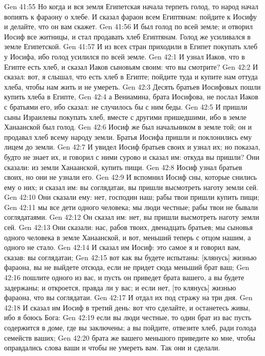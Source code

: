 Gen 41:55  Но когда и вся земля Египетская начала терпеть голод, то народ начал вопиять к фараону о хлебе. И сказал фараон всем Египтянам: пойдите к Иосифу и делайте, что он вам скажет.
Gen 41:56  И был голод по всей земле; и отворил Иосиф все житницы, и стал продавать хлеб Египтянам. Голод же усиливался в земле Египетской.
Gen 41:57  И из всех стран приходили в Египет покупать хлеб у Иосифа, ибо голод усилился по всей земле.
Gen 42:1  И узнал Иаков, что в Египте есть хлеб, и сказал Иаков сыновьям своим: что вы смотрите?
Gen 42:2  И сказал: вот, я слышал, что есть хлеб в Египте; пойдите туда и купите нам оттуда хлеба, чтобы нам жить и не умереть.
Gen 42:3  Десять братьев Иосифовых пошли купить хлеба в Египте,
Gen 42:4  а Вениамина, брата Иосифова, не послал Иаков с братьями его, ибо сказал: не случилось бы с ним беды.
Gen 42:5  И пришли сыны Израилевы покупать хлеб, вместе с другими пришедшими, ибо в земле Ханаанской был голод.
Gen 42:6  Иосиф же был начальником в земле той; он и продавал хлеб всему народу земли. Братья Иосифа пришли и поклонились ему лицем до земли.
Gen 42:7  И увидел Иосиф братьев своих и узнал их; но показал, будто не знает их, и говорил с ними сурово и сказал им: откуда вы пришли? Они сказали: из земли Ханаанской, купить пищи.
Gen 42:8  Иосиф узнал братьев своих, но они не узнали его.
Gen 42:9  И вспомнил Иосиф сны, которые снились ему о них; и сказал им: вы соглядатаи, вы пришли высмотреть наготу земли сей.
Gen 42:10  Они сказали ему: нет, господин наш; рабы твои пришли купить пищи;
Gen 42:11  мы все дети одного человека; мы люди честные; рабы твои не бывали соглядатаями.
Gen 42:12  Он сказал им: нет, вы пришли высмотреть наготу земли сей.
Gen 42:13  Они сказали: нас, рабов твоих, двенадцать братьев; мы сыновья одного человека в земле Ханаанской, и вот, меньший теперь с отцом нашим, а одного не стало.
Gen 42:14  И сказал им Иосиф: это самое я и говорил вам, сказав: вы соглядатаи;
Gen 42:15  вот как вы будете испытаны: [клянусь] жизнью фараона, вы не выйдете отсюда, если не придет сюда меньший брат ваш;
Gen 42:16  пошлите одного из вас, и пусть он приведет брата вашего, а вы будете задержаны; и откроется, правда ли у вас; и если нет, [то клянусь] жизнью фараона, что вы соглядатаи.
Gen 42:17  И отдал их под стражу на три дня.
Gen 42:18  И сказал им Иосиф в третий день: вот что сделайте, и останетесь живы, ибо я боюсь Бога:
Gen 42:19  если вы люди честные, то один брат из вас пусть содержится в доме, где вы заключены; а вы пойдите, отвезите хлеб, ради голода семейств ваших;
Gen 42:20  брата же вашего меньшого приведите ко мне, чтобы оправдались слова ваши и чтобы не умереть вам. Так они и сделали.

